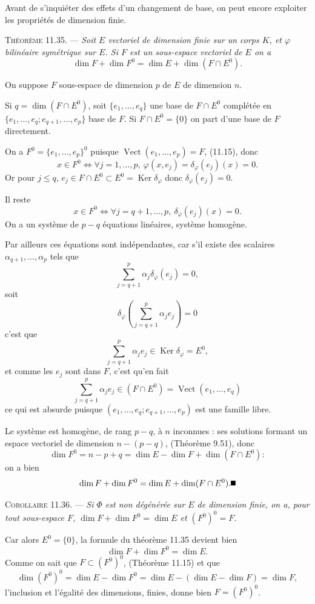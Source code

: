 Avant de s'inquiéter des effets d'un changement de base, on peut encore exploiter les propriétés de dimension finie.

\medskip\noindent\textsc{Théorème 11.35.} --- \emph{Soit $E$ vectoriel de dimension finie sur un corps $K$, et $\varphi$ bilinéaire symétrique sur $E$. Si $F$ est un sous-espace vectoriel de $E$ on a
\[
\dim F+\dim F^0=\dim E+\dim(F\cap E^0).
\]}

On suppose $F$ sous-espace de dimension $p$ de $E$ de dimension $n$.

Si $q=\dim(F\cap E^0)$, soit $\{e_1,\ldots,e_q\}$ une base de $F\cap E^0$ complétée en $\{e_1,\ldots,e_q;e_{q+1},\ldots,e_p\}$ base de $F$. Si $F\cap E^0=\{0\}$ on part d'une base de $F$ directement.

On a $F^0=\{e_1,\ldots,e_p\}^0$ puisque $\operatorname{Vect}(e_1,\ldots,e_p)=F$, (11.15), donc
\[
x\in F^0\Longleftrightarrow\forall j=1,\ldots,p,\ \varphi(x,e_j)=\delta_\varphi(e_j)(x)=0.
\]
Or pour $j\le q$, $e_j\in F\cap E^0\subset E^0=\operatorname{Ker}\delta_\varphi$ donc $\delta_\varphi(e_j)=0$.

Il reste
\[
x\in F^0\Longleftrightarrow\forall j=q+1,\ldots,p,\ \delta_\varphi(e_j)(x)=0.
\]
On a un système de $p-q$ équations linéaires, système homogène.

Par ailleurs ces équations sont indépendantes, car s'il existe des scalaires $\alpha_{q+1},\ldots,\alpha_p$ tels que
\[
\sum_{j=q+1}^p\alpha_j\delta_\varphi(e_j)=0,
\]
soit
\[
\delta_\varphi\left(\sum_{j=q+1}^p\alpha_je_j\right)=0
\]
c'est que
\[
\sum_{j=q+1}^p\alpha_je_j\in\operatorname{Ker}\delta_\varphi=E^0,
\]
et comme les $e_j$ sont dans $F$, c'est qu'en fait
\[
\sum_{j=q+1}^p\alpha_je_j\in(F\cap E^0)=\operatorname{Vect}(e_1,\ldots,e_q)
\]
ce qui est absurde puisque $(e_1,\ldots,e_q;e_{q+1},\ldots,e_p)$ est une famille libre.

Le système est homogène, de rang $p-q$, à $n$ inconnues : ses solutions formant un espace vectoriel de dimension $n-(p-q)$, (Théorème 9.51), donc
\[
\dim F^0=n-p+q=\dim E-\dim F+\dim(F\cap E^0):
\]
on a bien
\[
\dim F+\dim F^0=\dim E+\dim(F\cap E^0). \bookend
\]

\medskip\noindent\textsc{Corollaire 11.36.} --- \emph{Si $\Phi$ est non dégénérée sur $E$ de dimension finie, on a, pour tout sous-espace $F$, $\dim F+\dim F^0=\dim E$ et $(F^0)^0=F$.}

Car alors $E^0=\{0\}$, la formule du théorème 11.35 devient bien
\[
\dim F+\dim F^0=\dim E.
\]
Comme on sait que $F\subset(F^0)^0$, (Théorème 11.15) et que
\[
\dim(F^0)^0=\dim E-\dim F^0=\dim E-(\dim E-\dim F)=\dim F,
\]
l'inclusion et l'égalité des dimensions, finies, donne bien $F=(F^0)^0$. \bookend

